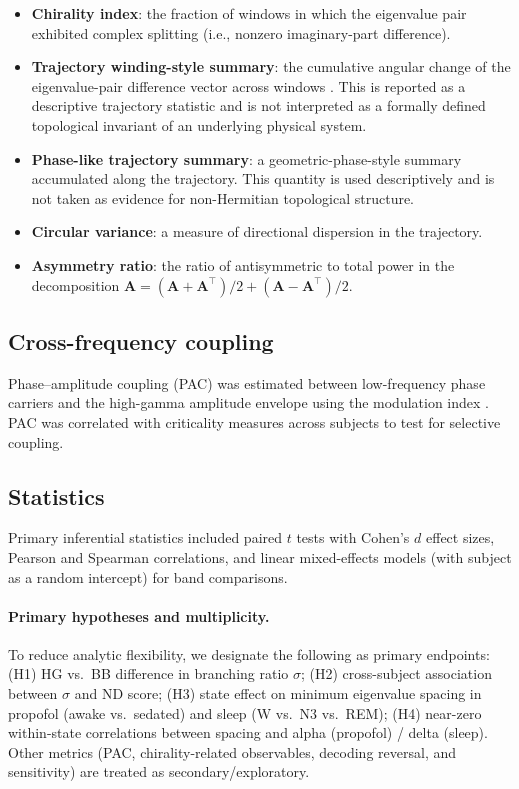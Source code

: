 \documentclass[preprint,12pt,nonatbib]{elsarticle}
\begin{document}
\begin{itemize}[leftmargin=1.5em]
    \item \textbf{Chirality index}: the fraction of windows in which the eigenvalue pair exhibited complex splitting (i.e., nonzero imaginary-part difference).
    \item \textbf{Trajectory winding-style summary}: the cumulative angular change of the eigenvalue-pair difference vector across windows \citep{RafiUlIslam2024}. This is reported as a descriptive trajectory statistic and is not interpreted as a formally defined topological invariant of an underlying physical system.
    \item \textbf{Phase-like trajectory summary}: a geometric-phase-style summary accumulated along the trajectory. This quantity is used descriptively and is not taken as evidence for non-Hermitian topological structure.
    \item \textbf{Circular variance}: a measure of directional dispersion in the trajectory.
    \item \textbf{Asymmetry ratio}: the ratio of antisymmetric to total power in the decomposition $\mathbf{A}=(\mathbf{A}+\mathbf{A}^\top)/2+(\mathbf{A}-\mathbf{A}^\top)/2$.
\end{itemize}

\subsection{Cross-frequency coupling}

Phase--amplitude coupling (PAC) was estimated between low-frequency phase carriers and the high-gamma amplitude envelope using the modulation index \citep{Daume2024,Sakakura2023}. PAC was correlated with criticality measures across subjects to test for selective coupling.

\subsection{Statistics}

Primary inferential statistics included paired $t$ tests with Cohen's $d$ effect sizes, Pearson and Spearman correlations, and linear mixed-effects models (with subject as a random intercept) for band comparisons.

\paragraph{Primary hypotheses and multiplicity.} To reduce analytic flexibility, we designate the following as primary endpoints: (H1) HG vs.\ BB difference in branching ratio $\sigma$; (H2) cross-subject association between $\sigma$ and ND score; (H3) state effect on minimum eigenvalue spacing in propofol (awake vs.\ sedated) and sleep (W vs.\ N3 vs.\ REM); (H4) near-zero within-state correlations between spacing and alpha (propofol) / delta (sleep). Other metrics (PAC, chirality-related observables, decoding reversal, and sensitivity) are treated as secondary/exploratory.
\end{document}
